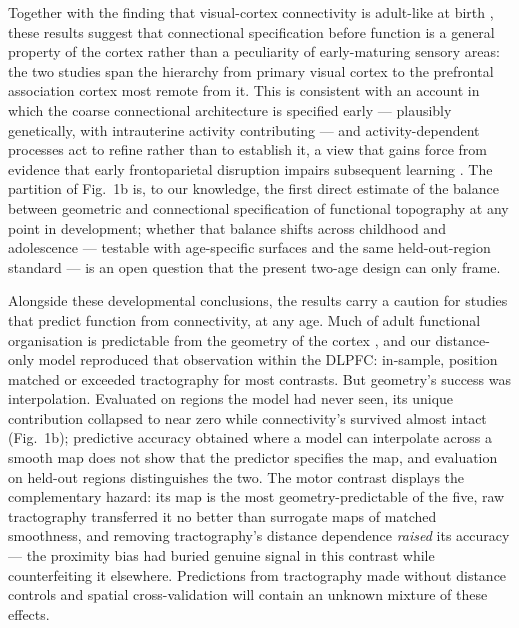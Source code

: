 \documentclass[11pt]{article}
\begin{document}
Together with the finding that visual-cortex connectivity is adult-like at
birth \citep{cabral2022}, these results suggest that connectional
specification before function is a general property of the cortex rather
than a peculiarity of early-maturing sensory areas: the two studies span
the hierarchy from primary visual cortex to the prefrontal association
cortex most remote from it. This is consistent with an account in which the
coarse connectional architecture is specified early --- plausibly
genetically, with intrauterine activity contributing --- and
activity-dependent processes act to refine rather than to establish it,
a view that gains force from evidence that early frontoparietal disruption
impairs subsequent learning \citep{linke2018}. The partition of Fig.~1b is,
to our knowledge, the first direct estimate of the balance between geometric
and connectional specification of functional topography at any point in
development; whether that balance shifts across childhood and adolescence
--- testable with age-specific surfaces and the same held-out-region
standard --- is an open question that the present two-age design can only
frame.

Alongside these developmental conclusions, the results carry a caution for
studies that predict function from connectivity, at any age. Much of adult
functional organisation is predictable from the geometry of the cortex
\citep{pang2023,margulies2016}, and our distance-only model reproduced that
observation within the DLPFC: in-sample, position matched or exceeded
tractography for most contrasts. But geometry's success was interpolation.
Evaluated on regions the model had never seen, its unique contribution
collapsed to near zero while connectivity's survived almost intact
(Fig.~1b); predictive accuracy obtained where a model can interpolate
across a smooth map does not show that the predictor specifies the map, and
evaluation on held-out regions distinguishes the two. The motor contrast
displays the complementary hazard: its map is the most geometry-predictable
of the five, raw tractography transferred it no better than surrogate maps
of matched smoothness, and removing tractography's distance dependence
\citep{donahue2016} \emph{raised} its accuracy --- the proximity bias had
buried genuine signal in this contrast while counterfeiting it elsewhere.
Predictions from tractography made without distance controls and spatial
cross-validation will contain an unknown mixture of these effects.
\end{document}
